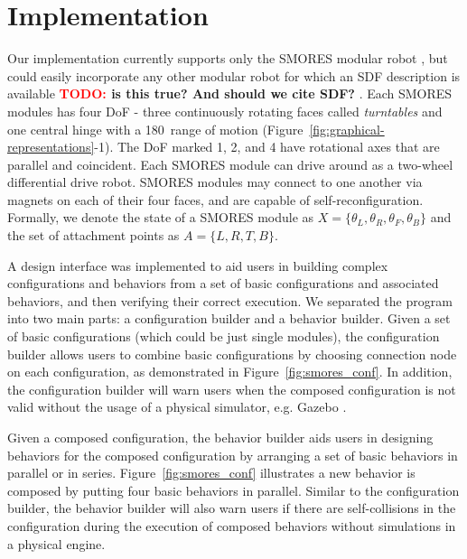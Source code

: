 \documentclass[graybox]{svmult}
\newcommand{\TODO}[1]{ {\bf \textcolor{red}{TODO:} #1 }}
\begin{document}
\section{Implementation }
\label{sec:implementation}
Our implementation currently supports only the SMORES modular robot \cite{Davey2012},  but
could easily  incorporate any other modular robot for which an SDF description is available
\TODO{is this true? And should we cite SDF?}. Each SMORES modules has four DoF
- three continuously rotating faces called {\em turntables} and one
central hinge with a 180\textdegree\ range of motion (Figure~\ref{fig:graphical-representations}-1). The
DoF marked 1, 2, and 4 have rotational axes that are parallel and coincident.
Each SMORES module can drive around as a two-wheel differential
drive robot.
SMORES modules may connect to one another via magnets on each of their four
faces, and are capable of  self-reconfiguration.
Formally, we denote the state of a SMORES module as \(X=\lbrace \theta_L, \theta_R,
\theta_F, \theta_B \rbrace\) and the set of attachment points as \(A=\lbrace L,R,T,B \rbrace\).


A design interface was implemented to aid users in building complex configurations and behaviors from a set of basic configurations and associated behaviors,
and then verifying their correct execution. We separated the program into two main parts: a configuration builder and a behavior builder.
Given a set of basic configurations (which could be just single modules), the configuration builder allows users to combine basic configurations by choosing connection node on each configuration, as demonstrated in Figure~\ref{fig:smores_conf}. In addition, the configuration builder will warn users when the composed configuration is not valid without the usage of a physical simulator, e.g. Gazebo
\cite{koenig2004design}.

Given a composed configuration, the behavior builder aids users in designing behaviors for the composed configuration by arranging a set of basic behaviors in parallel or in series. Figure~\ref{fig:smores_conf} illustrates a new behavior is composed by putting four basic behaviors in parallel. Similar to the configuration builder, the behavior builder will also warn users if there are self-collisions in the configuration during the execution of composed behaviors without simulations in a physical engine.
\end{document}
